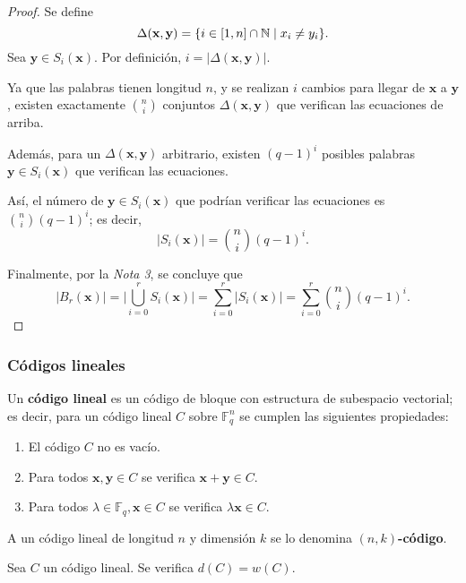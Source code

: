 \begin{proof}
	Se define
	\[\Delta(\textbf{x}, \textbf{y}) = \{i\in[1,n]\cap\mathbb{N} \mid x_i \neq y_i\}.\]
	Sea $\textbf{y} \in S_i(\textbf{x})$. Por definición, $i = |\Delta(\textbf{x}, \textbf{y})|$.
	
	Ya que las palabras tienen longitud $n$, y se realizan $i$ cambios para llegar de $\textbf{x}$ a $\textbf{y}$, existen exactamente $\binom{n}{i}$ conjuntos $\Delta(\textbf{x}, \textbf{y})$ que verifican las ecuaciones de arriba.
	
	Además, para un $\Delta(\textbf{x}, \textbf{y})$ arbitrario, existen $(q - 1)^i$ posibles palabras $\textbf{y} \in S_i(\textbf{x})$ que verifican las ecuaciones.
	
	Así, el número de $\textbf{y} \in S_i(\textbf{x})$ que podrían verificar las ecuaciones es $\binom{n}{i}(q - 1)^i$; es decir,
	\[|S_i(\textbf{x})| = \binom{n}{i}(q - 1)^i.\]
	
	Finalmente, por la \textit{Nota 3}, se concluye que
	\[|B_r(\textbf{x})| = \bigg|\bigcup_{i=0}^r S_i(\textbf{x})\bigg| = \sum_{i=0}^r |S_i(\textbf{x})| = \sum_{i=0}^r\binom{n}{i}(q - 1)^i.\]
\end{proof}

\subsubsection{Códigos lineales}

\begin{definition}
	Un \textbf{código lineal} es un código de bloque con estructura de subespacio vectorial; es decir, para un código lineal $C$ sobre $\mathbb{F}_q^n$ se cumplen las siguientes propiedades:
	\begin{enumerate}
		\item El código $C$ no es vacío.
		\item Para todos $\textbf{x}, \textbf{y} \in C$ se verifica $\textbf{x} + \textbf{y} \in C$.
		\item Para todos $\lambda \in \mathbb{F}_q, \textbf{x} \in C$ se verifica $\lambda\textbf{x} \in C$.
	\end{enumerate}

	A un código lineal de longitud $n$ y dimensión $k$ se lo denomina \textbf{$(n, k)$-código}.
\end{definition}

\begin{theorem}
	Sea $C$ un código lineal. Se verifica $d(C) = w(C)$.
\end{theorem}


